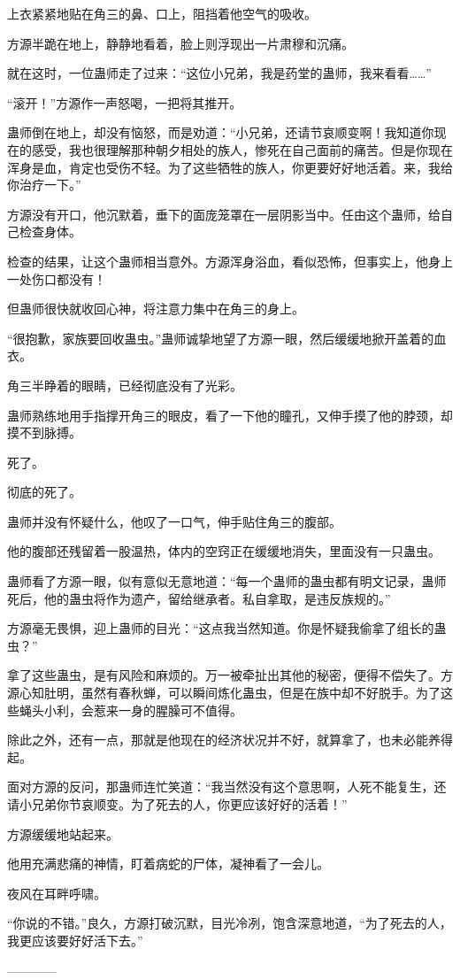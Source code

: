 \begin{this_body}
上衣紧紧地贴在角三的鼻、口上，阻挡着他空气的吸收。

方源半跪在地上，静静地看着，脸上则浮现出一片肃穆和沉痛。

就在这时，一位蛊师走了过来：“这位小兄弟，我是药堂的蛊师，我来看看……”

“滚开！”方源作一声怒喝，一把将其推开。

蛊师倒在地上，却没有恼怒，而是劝道：“小兄弟，还请节哀顺变啊！我知道你现在的感受，我也很理解那种朝夕相处的族人，惨死在自己面前的痛苦。但是你现在浑身是血，肯定也受伤不轻。为了这些牺牲的族人，你更要好好地活着。来，我给你治疗一下。”

方源没有开口，他沉默着，垂下的面庞笼罩在一层阴影当中。任由这个蛊师，给自己检查身体。

检查的结果，让这个蛊师相当意外。方源浑身浴血，看似恐怖，但事实上，他身上一处伤口都没有！

但蛊师很快就收回心神，将注意力集中在角三的身上。

“很抱歉，家族要回收蛊虫。”蛊师诚挚地望了方源一眼，然后缓缓地掀开盖着的血衣。

角三半睁着的眼睛，已经彻底没有了光彩。

蛊师熟练地用手指撑开角三的眼皮，看了一下他的瞳孔，又伸手摸了他的脖颈，却摸不到脉搏。

死了。

彻底的死了。

蛊师并没有怀疑什么，他叹了一口气，伸手贴住角三的腹部。

他的腹部还残留着一股温热，体内的空窍正在缓缓地消失，里面没有一只蛊虫。

蛊师看了方源一眼，似有意似无意地道：“每一个蛊师的蛊虫都有明文记录，蛊师死后，他的蛊虫将作为遗产，留给继承者。私自拿取，是违反族规的。”

方源毫无畏惧，迎上蛊师的目光：“这点我当然知道。你是怀疑我偷拿了组长的蛊虫？”

拿了这些蛊虫，是有风险和麻烦的。万一被牵扯出其他的秘密，便得不偿失了。方源心知肚明，虽然有春秋蝉，可以瞬间炼化蛊虫，但是在族中却不好脱手。为了这些蝇头小利，会惹来一身的腥臊可不值得。

除此之外，还有一点，那就是他现在的经济状况并不好，就算拿了，也未必能养得起。

面对方源的反问，那蛊师连忙笑道：“我当然没有这个意思啊，人死不能复生，还请小兄弟你节哀顺变。为了死去的人，你更应该好好的活着！”

方源缓缓地站起来。

他用充满悲痛的神情，盯着病蛇的尸体，凝神看了一会儿。

夜风在耳畔呼啸。

“你说的不错。”良久，方源打破沉默，目光冷冽，饱含深意地道，“为了死去的人，我更应该要好好活下去。”

------------

\end{this_body}

